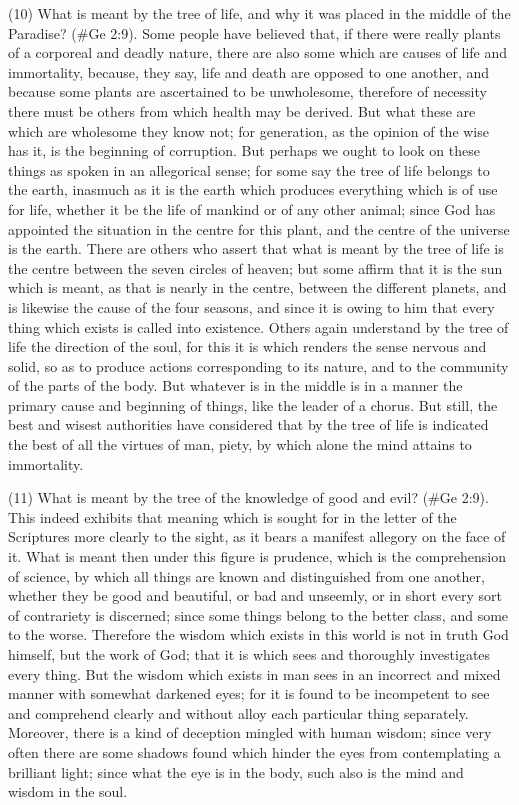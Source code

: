 (10) What is meant by the tree of life, and why it was placed in the middle of the Paradise?
(\#Ge 2:9). Some people have believed that, if there were really plants of a corporeal and
deadly nature, there are also some which are causes of life and immortality, because, they say, life
and death are opposed to one another, and because some plants are ascertained to be
unwholesome, therefore of necessity there must be others from which health may be derived. But
what these are which are wholesome they know not; for generation, as the opinion of the wise has
it, is the beginning of corruption. But perhaps we ought to look on these things as spoken in an
allegorical sense; for some say the tree of life belongs to the earth, inasmuch as it is the earth
which produces everything which is of use for life, whether it be the life of mankind or of any other
animal; since God has appointed the situation in the centre for this plant, and the centre of the
universe is the earth. There are others who assert that what is meant by the tree of life is the
centre between the seven circles of heaven; but some affirm that it is the sun which is meant, as
that is nearly in the centre, between the different planets, and is likewise the cause of the four
seasons, and since it is owing to him that every thing which exists is called into existence. Others
again understand by the tree of life the direction of the soul, for this it is which renders the sense
nervous and solid, so as to produce actions corresponding to its nature, and to the community of
the parts of the body. But whatever is in the middle is in a manner the primary cause and beginning
of things, like the leader of a chorus. But still, the best and wisest authorities have considered that
by the tree of life is indicated the best of all the virtues of man, piety, by which alone the mind
attains to immortality.

(11) What is meant by the tree of the knowledge of good and evil? (\#Ge 2:9). This indeed
exhibits that meaning which is sought for in the letter of the Scriptures more clearly to the sight, as
it bears a manifest allegory on the face of it. What is meant then under this figure is prudence,
which is the comprehension of science, by which all things are known and distinguished from one
another, whether they be good and beautiful, or bad and unseemly, or in short every sort of
contrariety is discerned; since some things belong to the better class, and some to the worse.
Therefore the wisdom which exists in this world is not in truth God himself, but the work of God; that
it is which sees and thoroughly investigates every thing. But the wisdom which exists in man sees
in an incorrect and mixed manner with somewhat darkened eyes; for it is found to be incompetent
to see and comprehend clearly and without alloy each particular thing separately. Moreover, there
is a kind of deception mingled with human wisdom; since very often there are some shadows found
which hinder the eyes from contemplating a brilliant light; since what the eye is in the body, such
also is the mind and wisdom in the soul.

